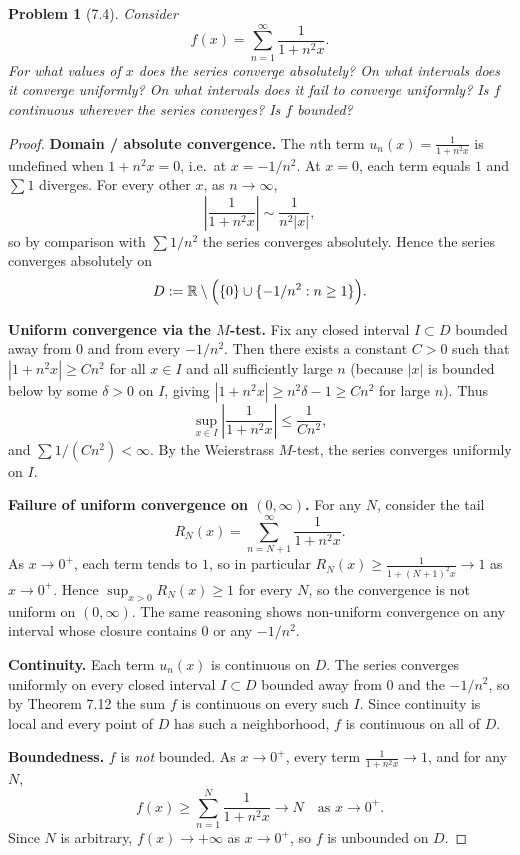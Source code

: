 \documentclass[12 pt]{article}
\newtheorem{prob}{Problem}
\begin{document}
\begin{prob}[7.4]
Consider
$$
f(x)=\sum_{n=1}^{\infty} \frac{1}{1+n^{2} x}.
$$
For what values of $x$ does the series converge absolutely? On what intervals does it converge uniformly? On what intervals does it fail to converge uniformly? Is $f$ continuous wherever the series converges? Is $f$ bounded?
\end{prob}
\begin{proof}
\textbf{Domain / absolute convergence.} The $n$th term $u_n(x) = \frac{1}{1 + n^2 x}$ is undefined when $1 + n^2 x = 0$, i.e.\ at $x = -1/n^2$. At $x = 0$, each term equals $1$ and $\sum 1$ diverges. For every other $x$, as $n \to \infty$,
$$
\left| \frac{1}{1 + n^2 x} \right| \sim \frac{1}{n^2 |x|},
$$
so by comparison with $\sum 1/n^2$ the series converges absolutely. Hence the series converges absolutely on
$$
D := \mathbb{R} \setminus \Bigl(\{0\} \cup \{-1/n^2 : n \geq 1\}\Bigr).
$$

\textbf{Uniform convergence via the $M$-test.} Fix any closed interval $I \subset D$ bounded away from $0$ and from every $-1/n^2$. Then there exists a constant $C > 0$ such that $|1 + n^2 x| \geq C n^2$ for all $x \in I$ and all sufficiently large $n$ (because $|x|$ is bounded below by some $\delta > 0$ on $I$, giving $|1 + n^2 x| \geq n^2 \delta - 1 \geq C n^2$ for large $n$). Thus
$$
\sup_{x \in I} \left| \frac{1}{1 + n^2 x} \right| \leq \frac{1}{C n^2},
$$
and $\sum 1/(Cn^2) < \infty$. By the Weierstrass $M$-test, the series converges uniformly on $I$.

\textbf{Failure of uniform convergence on $(0, \infty)$.} For any $N$, consider the tail
$$
R_N(x) = \sum_{n=N+1}^{\infty} \frac{1}{1 + n^2 x}.
$$
As $x \to 0^+$, each term tends to $1$, so in particular $R_N(x) \geq \frac{1}{1 + (N+1)^2 x} \to 1$ as $x \to 0^+$. Hence $\sup_{x > 0} R_N(x) \geq 1$ for every $N$, so the convergence is not uniform on $(0, \infty)$. The same reasoning shows non-uniform convergence on any interval whose closure contains $0$ or any $-1/n^2$.

\textbf{Continuity.} Each term $u_n(x)$ is continuous on $D$. The series converges uniformly on every closed interval $I \subset D$ bounded away from $0$ and the $-1/n^2$, so by Theorem 7.12 the sum $f$ is continuous on every such $I$. Since continuity is local and every point of $D$ has such a neighborhood, $f$ is continuous on all of $D$.

\textbf{Boundedness.} $f$ is \emph{not} bounded. As $x \to 0^+$, every term $\frac{1}{1 + n^2 x} \to 1$, and for any $N$,
$$
f(x) \geq \sum_{n=1}^{N} \frac{1}{1 + n^2 x} \longrightarrow N \quad \text{as } x \to 0^+.
$$
Since $N$ is arbitrary, $f(x) \to +\infty$ as $x \to 0^+$, so $f$ is unbounded on $D$.
\end{proof}
\end{document}
